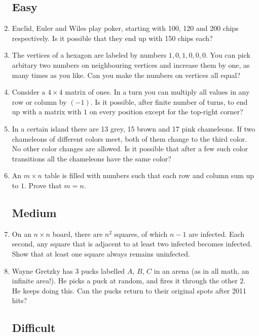 \documentclass[11pt,a5paper]{article}
\begin{document}
\begin{enumerate}
	\subsection*{Easy}
	\item{Euclid, Euler and Wiles play poker, starting with 100, 120 and 200 chips respectively. Is it possible that they end up with 150 chips each?}

	\item{The vertices of a hexagon are labeled by numbers $1, 0, 1, 0, 0, 0$. You can pick arbitary two numbers on neighbouring vertices and increase them by one, as many times as you like. Can you make the numbers on vertices all equal?}
	
	\item{Consider a $4\times 4$ matrix of ones. In a turn you can  multiply all values in any row or column by $(-1)$. Is it possible, after finite number of turns, to end up with a matrix with $1$ on every position except for the top-right corner?}
		
	\item{In a certain island there are 13 grey, 15 brown and 17 pink chameleons. If two chameleons of different colors meet, both of them change to the third color. No other color changes are allowed. Is it possible that after a few such color transitions all the chameleons have the same color?}
	
	\item{An $m\times n$ table is filled with numbers such that each row and column sum up to $1$. Prove
that $m = n$.}

	\subsection*{Medium}
		
	\item{On an $n\times n$ board, there are $n^{2}$ squares, of which $n - 1$ are infected. Each second, any square that is adjacent to at least two infected becomes infected. Show that at least one square always remains uninfected.}
	
	\item{Wayne Gretzky has 3 pucks labelled $A$, $B$, $C$ in an arena (as in all math, an infinite area!). He picks a puck at random, and fires it through the other $2$. He keeps doing this. Can the pucks return to their original spots after 2011 hits?}

	\subsection*{Difficult}
	

\end{enumerate}
\end{document}
